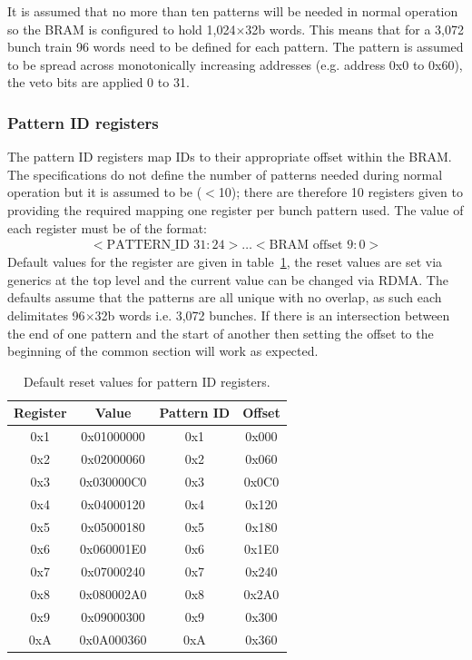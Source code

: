 It is assumed that no more than ten patterns will be needed in normal operation so the BRAM is configured to hold 1,024\( \times  \)32b words. This means that for a 3,072 bunch train 96 words need to be defined for each pattern. The pattern is assumed to be spread across monotonically increasing addresses (e.g. address 0x0 to 0x60), the veto bits are applied 0 to 31. 
\subsubsection{Pattern ID registers} %
\label{sub:pattern_id_registers}
The pattern ID registers map IDs to their appropriate offset within the BRAM. The specifications do not define the number of patterns needed during normal operation but it is assumed to be (\( < \)10); there are therefore 10 registers given to providing the required mapping one register per bunch pattern used. The value of each register must be of the format:
\begin{align} \label{fmt:pattern_id}
  <\text{PATTERN\_ID } 31:24>\ldots<\text{BRAM offset } 9:0> 
\end{align}
Default values for the register are given in table~\ref{tab:default_pattern_id_reg}, the reset values are set via generics at the top level and the current value can be changed via RDMA. The defaults assume that the patterns are all unique with no overlap, as such each delimitates 96\( \times \)32b words i.e. 3,072 bunches. If there is an intersection between the end of one pattern and the start of another then setting the offset to the beginning of the common section will work as expected.
\begin{table}
  \begin{center}
    \begin{tabular}{c|c|c|c}
      Register & Value      & Pattern ID & Offset \\
      \hline
      0x1      & 0x01000000 & 0x1        & 0x000  \\ 
      0x2      & 0x02000060 & 0x2        & 0x060  \\  
      0x3      & 0x030000C0 & 0x3        & 0x0C0  \\ 
      0x4      & 0x04000120 & 0x4        & 0x120  \\ 
      0x5      & 0x05000180 & 0x5        & 0x180  \\ 
      0x6      & 0x060001E0 & 0x6        & 0x1E0  \\ 
      0x7      & 0x07000240 & 0x7        & 0x240  \\ 
      0x8      & 0x080002A0 & 0x8        & 0x2A0  \\ 
      0x9      & 0x09000300 & 0x9        & 0x300  \\ 
      0xA      & 0x0A000360 & 0xA        & 0x360  \\ 
    \end{tabular}
  \end{center}
  \caption{Default reset values for pattern ID registers.}
  \label{tab:default_pattern_id_reg}
\end{table}
